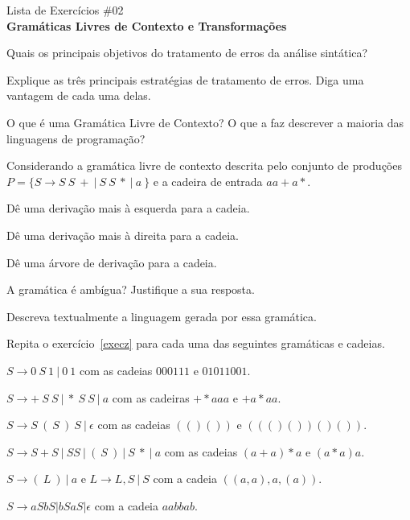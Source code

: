 \documentclass{compiladores}
\begin{document}
\begin{center}
{\LARGE Lista de Exercícios \#02}\\
{\bf Gramáticas Livres de Contexto e Transformações}
\end{center}

\begin{listanumerada}
\item
Quais os principais objetivos do tratamento de erros da análise sintática?

\item 
Explique as três principais estratégias de tratamento de erros. Diga
uma vantagem de cada uma delas.

\item
O que é uma Gramática Livre de Contexto? O que a faz descrever a maioria das linguagens de programação?

\item
\label{execz}
Considerando a gramática livre de contexto descrita pelo conjunto de
produções $P = \{ S \rightarrow S\ S\ +\ |\ S\ S\ *\ |\ a\ \}$ e a
cadeira de entrada $aa + a*$.
\begin{lista}
\item Dê uma derivação mais à esquerda para a cadeia.
\item Dê uma derivação mais à direita para a cadeia.
\item Dê uma árvore de derivação para a cadeia.
\item A gramática é ambígua? Justifique a sua resposta.
\item Descreva textualmente a linguagem gerada por essa gramática.
\end{lista}

\item
Repita o exercício~\ref{execz} para cada uma das seguintes gramáticas e cadeias.
\begin{lista}
\item $S \rightarrow 0\ S\ 1\ |\ 0\ 1$ com as cadeias $000111$ e $01011001$. 
\item $S \rightarrow +\ S\ S\ |\ *\ S\ S\ |\ a$ com as cadeiras $+*aaa$ e $+a*aa$.
\item $S \rightarrow S\ (\ S\ )\ S\ |\ {\epsilon}$ com as cadeias $(()())$ e $((()())()())$.
\item $S \rightarrow S + S\ |\ SS\ |\ (\ S\ )\ |\ S\ *\ |\ a$ com as cadeias $(a+a)*a$ e $(a*a)a$.
\item $S \rightarrow (\ L\ )\ |\ a$ e $L \rightarrow L, S\ |\ S$ com a cadeia $((a,a),a,(a))$.
\item $S \rightarrow aSbS | bSaS | {\epsilon}$ com a cadeia $aabbab$.
\end{lista}


\end{listanumerada}
\end{document}
